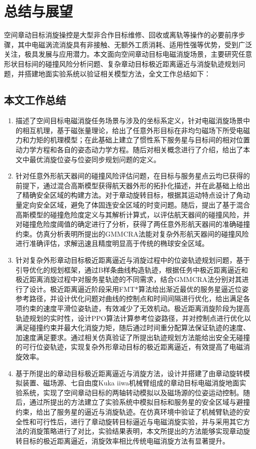 \documentclass[lang=chs, degree=master, blindreview=false, winfonts=true]{yanputhesis}
\begin{document}
\cleardoublepage

\chapter{总结与展望}
空间章动目标消旋操控是大型非合作目标维修、回收或离轨等操作的必要前序步骤，其中电磁涡流消旋具有非接触、无额外工质消耗、适用性强等优势，受到广泛关注，极具发展与应用潜力。本文面向空间章动目标电磁消旋场景，主要研究任意形状目标间的碰撞风险分析问题、复杂章动目标极近距离逼近与消旋轨迹规划问题，并搭建地面实验系统以验证相关模型方法，全文工作总结如下：

\section{本文工作总结}
\begin{enumerate}
	\item 描述了空间目标电磁消旋任务场景与涉及的坐标系定义，针对电磁消旋场景中的相互机理，基于磁张量理论，给出了任意外形目标在非均匀磁场下所受电磁力和力矩的机理模型；在此基础上建立了惯性系下服务星与目标间的相对位置动力学方程和各自的姿态动力学方程。随后对相关概念进行了介绍，给出了本文中最优消旋位姿与位姿同步规划问题的定义。
	
	\item 针对任意外形航天器间的碰撞风险评估问题，在目标与服务星点云均已获得的前提下，通过混合高斯模型获得航天器外形的拓扑化描述，并在此基础上给出了精确安全区域的构建方法。对于章动旋转目标，根据其运动特点设计了角动量定向安全区域，避免了体固连安全区域的时变问题。随后，提出了基于混合高斯模型的碰撞危险度定义与其解析计算式，以评估航天器间的碰撞风险，并对碰撞危险度阈值的确定进行了分析，获得了两任意外形航天器间的准确碰撞约束。仿真分析表明所提出的GMMCRA法能对复杂外形航天器间的碰撞风险进行准确评估，求解迅速且精度明显高于传统的椭球安全区域。
	
	\item 针对复杂外形章动目标极近距离逼近与消旋过程中的位姿轨迹规划问题，基于引导优化的规划框架，通过B样条曲线构造轨迹，根据任务中极近距离逼近和极近距离消旋过程中对服务星轨迹的不同需求，结合GMMCRA法分别对其进行了设计。极近距离逼近阶段采用FMT*算法给出渐近最优的服务星逼近位姿参考路径，并设计优化问题对曲线的控制点和时间间隔进行优化，给出满足各项约束的速度平滑位姿轨迹，有效减少了无效机动。极近距离消旋阶段为提高轨迹规划的实时性，设计PPO算法计算参考位姿路径，并对控制点进行优化以满足碰撞约束并最大化消旋力矩，随后通过时间重分配算法保证轨迹的速度、加速度满足要求。通过相关仿真验证了所提出轨迹规划方法能给出安全无碰撞的可行位姿轨迹，实现复杂外形章动目标的极近距离逼近，有效提高了电磁消旋效率。
	
	\item 基于所提出的章动目标极近距离逼近与消旋方法，设计并搭建了由章动旋转模拟装置、磁场源、七自由度Kuka iiwa机械臂组成的章动目标电磁消旋地面实验系统，实现了空间章动目标的两轴转动模拟以及磁场源的位姿运动控制。随后，通过所提出的方法建立了实验系统中模拟目标和服务星的安全区域与避撞约束，给出了服务星的逼近与消旋轨迹。在仿真环境中验证了机械臂轨迹的安全性和可行性后，进行了章动旋转目标逼近与电磁消旋实验，并与采用其它方法的消旋策略进行了对比，实验结果表明，本文所提出的方法能够实现章动旋转目标的极近距离逼近，消旋效率相比传统电磁消旋方法有显著提升。
\end{enumerate}
\end{document}
